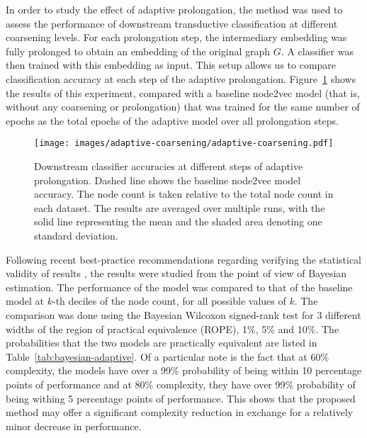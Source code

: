 In order to study the effect of adaptive prolongation, the method was used to assess the performance of downstream transductive classification at different coarsening levels. For each prolongation step, the intermediary embedding was fully prolonged to obtain an embedding of the original graph \( G \). A classifier was then trained with this embedding as input. This setup allows us to compare classification accuracy at each step of the adaptive prolongation. Figure~\ref{fig:adaptive-coarsening} shows the results of this experiment, compared with a baseline node2vec model (that is, without any coarsening or prolongation) that was trained for the same number of epochs as the total epochs of the adaptive model over all prolongation steps.

\begin{figure}
  \centering
  \texttt{[image: images/adaptive-coarsening/adaptive-coarsening.pdf]}
  \caption{Downstream classifier accuracies at different steps of adaptive prolongation. Dashed line shows the baseline node2vec model accuracy. The node count is taken relative to the total node count in each dataset. The results are averaged over multiple runs, with the solid line representing the mean and the shaded area denoting one standard deviation.}
  \label{fig:adaptive-coarsening}
\end{figure}

Following recent best-practice recommendations regarding verifying the statistical validity of results \cite{benavoli_time_2017}, the results were studied from the point of view of Bayesian estimation. The performance of the model was compared to that of the baseline model at \( k \)-th deciles of the node count, for all possible values of \( k \). The comparison was done using the Bayesian Wilcoxon signed-rank test \cite{benavoli_bayesian_2014} for 3 different widths of the region of practical equivalence (ROPE), 1\%, 5\% and 10\%. The probabilities that the two models are practically equivalent are listed in Table~\ref{tab:bayesian-adaptive}. Of a particular note is the fact that  at 60\% complexity, the models have over a 99\% probability of being within 10 percentage points of performance and at 80\% complexity, they have over 99\% probability of being withing 5 percentage points of performance. This shows that the proposed method may offer a significant complexity reduction in exchange for a relatively minor decrease in performance.


